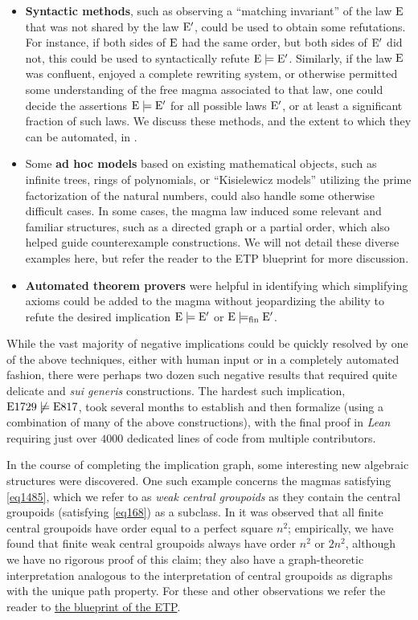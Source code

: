 \begin{itemize}
        \item \textbf{Syntactic methods}, such as observing a ``matching invariant'' of the law $\mathrm{E}$ that was not shared by the law ${\mathrm{E}'}$, could be used to obtain some refutations.  For instance, if both sides of $\mathrm{E}$ had the same order, but both sides of ${\mathrm{E}'}$ did not, this could be used to syntactically refute ${\mathrm{E}} \models {\mathrm{E}'}$.  Similarly, if the law $\mathrm{E}$ was confluent, enjoyed a complete rewriting system, or otherwise permitted some understanding of the free magma associated to that law, one could decide the assertions ${\mathrm{E}} \models {\mathrm{E}'}$ for all possible laws ${\mathrm{E}'}$, or at least a significant fraction of such laws.  We discuss these methods, and the extent to which they can be automated, in .
        \item Some \textbf{ad hoc models} based on existing mathematical objects, such as infinite trees, rings of polynomials, or ``Kisielewicz models'' utilizing the prime factorization of the natural numbers, could also handle some otherwise difficult cases.  In some cases, the magma law induced some relevant and familiar structures, such as a directed graph or a partial order, which also helped guide counterexample constructions. We will not detail these diverse examples here, but refer the reader to the ETP blueprint for more discussion.
        \item \textbf{Automated theorem provers} were helpful in identifying which simplifying axioms could be added to the magma without jeopardizing the ability to refute the desired implication ${\mathrm{E}} \models {\mathrm{E}'}$ or ${\mathrm{E}} \models_{\mathrm{fin}} {\mathrm{E}'}$.
\end{itemize}

While the vast majority of negative implications could be quickly resolved by one of the above techniques, either with human input or in a completely automated fashion, there were perhaps two dozen such negative results that required quite delicate and \emph{sui generis} constructions.  The hardest such implication, $\mathrm{E}1729 \not\models \mathrm{E}817$, took several months to establish and then formalize (using a combination of many of the above constructions), with the final proof in \emph{Lean} requiring just over $\num{4000}$ dedicated lines of code from multiple contributors.

In the course of completing the implication graph, some interesting new algebraic structures were discovered.  One such example concerns the magmas satisfying \eqref{eq1485}, which we refer to as \emph{weak central groupoids} as they contain the central groupoids (satisfying \eqref{eq168}) as a subclass.  In \cite{knuth} it was observed that all finite central groupoids have order equal to a perfect square $n^2$; empirically, we have found that finite weak central groupoids always have order $n^2$ or $2n^2$, although we have no rigorous proof of this claim; they also have a graph-theoretic interpretation analogous to the interpretation of central groupoids as digraphs with the unique path property.  For these and other observations we refer the reader to \href{https://teorth.github.io/equational_theories/blueprint/weak-central-groupoids-chapter.html}{the blueprint of the ETP}.

